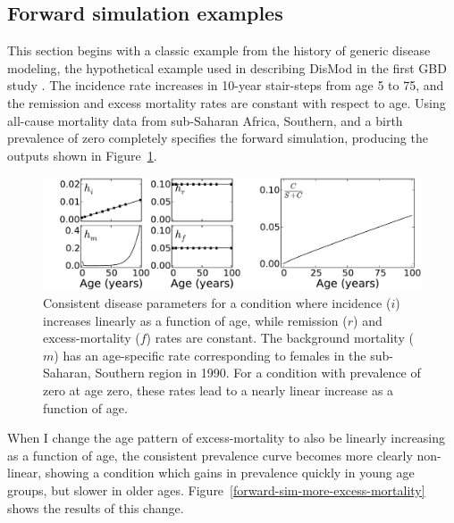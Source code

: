 \subsection{Forward simulation examples}

This section begins with a classic example from the history of generic
disease modeling, the hypothetical example used in describing DisMod
in the first GBD study
\cite{harvard_school_of_public_health.;world_health_organization.;world_bank._global_1996}
. The incidence rate increases in 10-year stair-steps from age 5 to
75, and the remission and excess mortality rates are constant with
respect to age.  Using all-cause mortality data from sub-Saharan
Africa, Southern, and a birth prevalence of zero completely specifies
the forward simulation, producing the outputs shown in
Figure~\ref{forward-sim-ex1}.

\begin{figure}[h]
\begin{center}
\includegraphics[width=\textwidth]{initial.pdf}
\caption{Consistent disease parameters for a condition where incidence
  ($i$) increases linearly as a function of age, while remission ($r$)
  and excess-mortality ($f$) rates are constant. The background
  mortality ($m$) has an age-specific rate corresponding to females in
  the sub-Saharan, Southern region in 1990. For a condition with
  prevalence of zero at age zero, these rates lead to a nearly linear
  increase as a function of age.}
\label{forward-sim-ex1}
\end{center}
\end{figure}

When I change the age pattern of excess-mortality to also be linearly
increasing as a function of age, the consistent prevalence curve
becomes more clearly non-linear, showing a condition which gains in
prevalence quickly in young age groups, but slower in older
ages. Figure~\ref{forward-sim-more-excess-mortality} shows the results
of this change.

